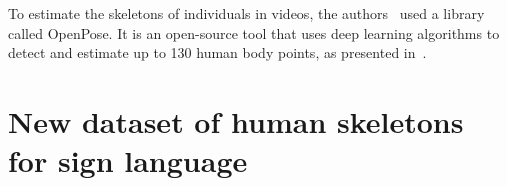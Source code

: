 


To estimate the skeletons of individuals in videos, the authors~\cite{st-gcn-2018} used a library called OpenPose. It is an open-source tool that uses deep learning algorithms to detect and estimate up to 130 human body points, as presented in~\cite{cao-realtime-2017,simon-hand-2017,wei-cpm-2016}. %



\section{New dataset of human skeletons for sign language} 
\label{sec:new-dataset}

